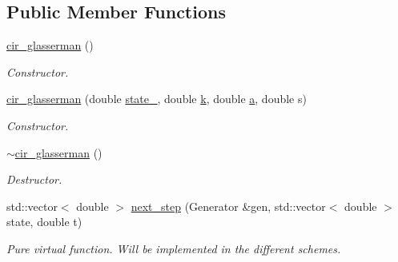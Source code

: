 \subsection*{Public Member Functions}
\begin{DoxyCompactItemize}
\item 
\hyperlink{classcir__glasserman_a992c04280cd4f2bca585df0e940cd928}{cir\+\_\+glasserman} ()\hypertarget{classcir__glasserman_a992c04280cd4f2bca585df0e940cd928}{}\label{classcir__glasserman_a992c04280cd4f2bca585df0e940cd928}

\begin{DoxyCompactList}\small\item\em Constructor. \end{DoxyCompactList}\item 
\hyperlink{classcir__glasserman_aa17f7ef0554ccd8a8e96779e9c8c501d}{cir\+\_\+glasserman} (double \hyperlink{classprocess_ab4d01c8ea2e9c8285134786d32ae42aa}{state\+\_}, double \hyperlink{classcir_aa5b05ff03ee8bb587ea94426a9ce704b}{k}, double \hyperlink{classcir_a358578305ea60d31c00546233304651c}{a}, double s)\hypertarget{classcir__glasserman_aa17f7ef0554ccd8a8e96779e9c8c501d}{}\label{classcir__glasserman_aa17f7ef0554ccd8a8e96779e9c8c501d}

\begin{DoxyCompactList}\small\item\em Constructor. \end{DoxyCompactList}\item 
\hyperlink{classcir__glasserman_a75da65ee14fd95b6352e76a432144122}{$\sim$cir\+\_\+glasserman} ()\hypertarget{classcir__glasserman_a75da65ee14fd95b6352e76a432144122}{}\label{classcir__glasserman_a75da65ee14fd95b6352e76a432144122}

\begin{DoxyCompactList}\small\item\em Destructor. \end{DoxyCompactList}\item 
std\+::vector$<$ double $>$ \hyperlink{classcir__glasserman_aa3a48d9de6edccd4bfb8a52a5e5ad3df}{next\+\_\+step} (Generator \&gen, std\+::vector$<$ double $>$ state, double t)\hypertarget{classcir__glasserman_aa3a48d9de6edccd4bfb8a52a5e5ad3df}{}\label{classcir__glasserman_aa3a48d9de6edccd4bfb8a52a5e5ad3df}

\begin{DoxyCompactList}\small\item\em Pure virtual function. Will be implemented in the different schemes. \end{DoxyCompactList}\end{DoxyCompactItemize}
